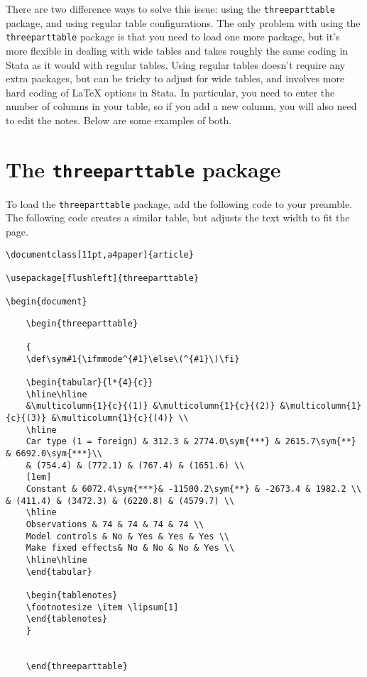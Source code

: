 \documentclass[11pt,a4paper]{article}
\begin{document}
There are two difference ways to solve this issue: using the \texttt{threeparttable} package, and using regular table configurations. The only problem with using the \texttt{threeparttable} package is that you need to load one more package, but it's more flexible in dealing with wide tables and takes roughly the same coding in Stata as it would with regular tables. Using regular tables doesn't require any extra packages, but can be tricky to adjust for wide tables, and involves more hard coding of {\LaTeX} options in Stata. In particular, you need to enter the number of columns in your table, so if you add a new column, you will also need to edit the notes. Below are some examples of both.

\section{The \texttt{threeparttable} package}

To load the \texttt{threeparttable} package, add the following code to your preamble. The following code creates a similar table, but adjusts the text width to fit the page.

\begin{verbatim}
\documentclass[11pt,a4paper]{article}

\usepackage[flushleft]{threeparttable}

\begin{document}
\end{verbatim}

\begin{tiny}
	\begin{verbatim}
	\begin{threeparttable}
	
	{
	\def\sym#1{\ifmmode^{#1}\else\(^{#1}\)\fi}
	
	\begin{tabular}{l*{4}{c}}
	\hline\hline
	&\multicolumn{1}{c}{(1)} &\multicolumn{1}{c}{(2)} &\multicolumn{1}{c}{(3)} &\multicolumn{1}{c}{(4)} \\
	\hline
	Car type (1 = foreign) & 312.3 & 2774.0\sym{***} & 2615.7\sym{**} & 6692.0\sym{***}\\
	& (754.4) & (772.1) & (767.4) & (1651.6) \\
	[1em]
	Constant & 6072.4\sym{***}& -11500.2\sym{**} & -2673.4 & 1982.2 \\ & (411.4) & (3472.3) & (6220.8) & (4579.7) \\
	\hline
	Observations & 74 & 74 & 74 & 74 \\
	Model controls & No & Yes & Yes & Yes \\
	Make fixed effects& No & No & No & Yes \\
	\hline\hline 
	\end{tabular}
	
	\begin{tablenotes} 
	\footnotesize \item \lipsum[1] 
	\end{tablenotes}
	}
	
	
	\end{threeparttable}
	\end{verbatim}
\end{tiny}
\end{document}

